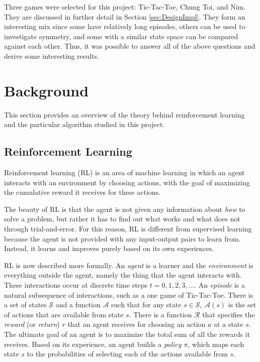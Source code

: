 \documentclass[11pt,a4paper]{report}
\begin{document}
Three games were selected for this project: Tic-Tac-Toe, Chung Toi, and Nim. They are discussed in further detail in Section \ref{sec:DesignImpl}. They form an interesting mix since some have relatively long episodes, others can be used to investigate symmetry, and some with a similar state space can be compared against each other. Thus, it was possible to answer all of the above questions and derive some interesting results.



\chapter{Background}

This section provides an overview of the theory behind reinforcement learning and the particular algorithm studied in this project.

\section{Reinforcement Learning}
\label{sec:RL}

Reinforcement learning (RL) is an area of machine learning in which an agent interacts with an environment by choosing actions, with the goal of maximizing the cumulative reward it receives for these actions.

The beauty of RL is that the agent is not given any information about \emph{how} to solve a problem, but rather it has to find out what works and what does not through trial-and-error. For this reason, RL is different from supervised learning because the agent is not provided with any input-output pairs to learn from. Instead, it learns and improves purely based on its own experiences.

RL is now described more formally. An \emph{agent} is a learner and the \emph{environment} is everything outside the agent, namely the thing that the agent interacts with. These interactions occur at discrete time steps $t = 0, 1, 2, 3, ...$. An \emph{episode} is a natural subsequence of interactions, such as a one game of Tic-Tac-Toe. There is a set of states $\mathcal{S}$ and a function $\mathcal{A}$ such that for any state $s \in \mathcal{S}$, $\mathcal{A}(s)$ is the set of actions that are available from state $s$. There is a function $\mathcal{R}$ that specifies the \emph{reward} (or \emph{return}) $r$ that an agent receives for choosing an action $a$ at a state $s$. The ultimate goal of an agent is to maximize the total sum of all the rewards it receives. Based on its experience, an agent builds a \emph{policy} $\pi$, which maps each state $s$ to the probabilities of selecting each of the actions available from $s$.
\end{document}
